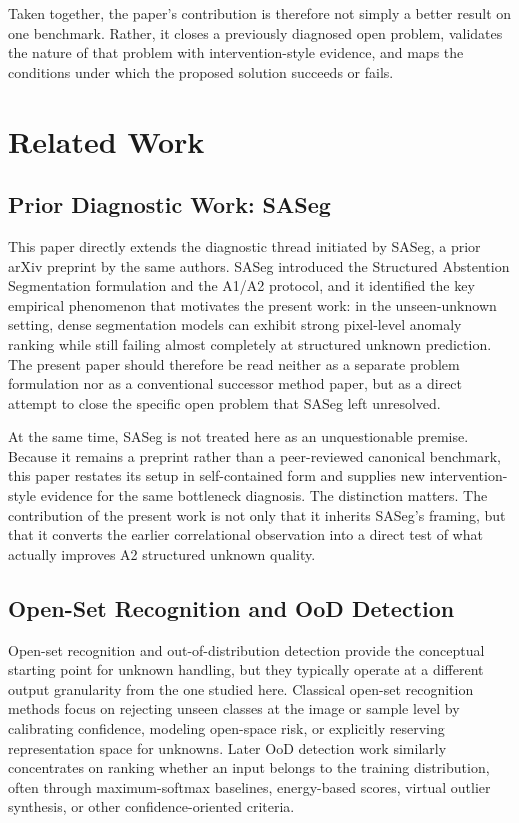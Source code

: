 \documentclass[a4paper,fleqn]{cas-dc}
\begin{document}
Taken together, the paper's contribution is therefore not simply a better result on one benchmark. Rather, it closes a previously diagnosed open problem, validates the nature of that problem with intervention-style evidence, and maps the conditions under which the proposed solution succeeds or fails.

\section{Related Work}
\label{sec:related}

\subsection{Prior Diagnostic Work: SASeg}
\label{sec:related:saseg}

This paper directly extends the diagnostic thread initiated by SASeg, a prior arXiv preprint by the same authors. SASeg introduced the Structured Abstention Segmentation formulation and the A1/A2 protocol, and it identified the key empirical phenomenon that motivates the present work: in the unseen-unknown setting, dense segmentation models can exhibit strong pixel-level anomaly ranking while still failing almost completely at structured unknown prediction. The present paper should therefore be read neither as a separate problem formulation nor as a conventional successor method paper, but as a direct attempt to close the specific open problem that SASeg left unresolved.

At the same time, SASeg is not treated here as an unquestionable premise. Because it remains a preprint rather than a peer-reviewed canonical benchmark, this paper restates its setup in self-contained form and supplies new intervention-style evidence for the same bottleneck diagnosis. The distinction matters. The contribution of the present work is not only that it inherits SASeg's framing, but that it converts the earlier correlational observation into a direct test of what actually improves A2 structured unknown quality.


\subsection{Open-Set Recognition and OoD Detection}
\label{sec:related:osr}

Open-set recognition and out-of-distribution detection provide the conceptual starting point for unknown handling, but they typically operate at a different output granularity from the one studied here. Classical open-set recognition methods focus on rejecting unseen classes at the image or sample level by calibrating confidence, modeling open-space risk, or explicitly reserving representation space for unknowns. Later OoD detection work similarly concentrates on ranking whether an input belongs to the training distribution, often through maximum-softmax baselines, energy-based scores, virtual outlier synthesis, or other confidence-oriented criteria.
\end{document}
